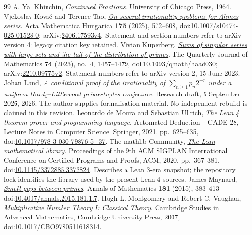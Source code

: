\begin{thebibliography}{99}
 A. Ya. Khinchin, \emph{Continued Fractions}.
  University of Chicago Press, 1964.
 Vjekoslav Kova\v{c} and Terence Tao, \href{https://arxiv.org/abs/2406.17593v4}{\emph{On several irrationality problems for Ahmes series}}.
  Acta Mathematica Hungarica \textbf{175} (2025), 572--608, doi:\href{https://doi.org/10.1007/s10474-025-01528-0}{10.1007/s10474-025-01528-0}; arXiv:\href{https://arxiv.org/abs/2406.17593v4}{2406.17593v4}. Statement and section numbers refer to arXiv version 4; legacy citation key retained.
 Vivian Kuperberg, \href{https://arxiv.org/abs/2210.09775v2}{\emph{Sums of singular series with large sets and the tail of the distribution of primes}}.
  The Quarterly Journal of Mathematics \textbf{74} (2023), no.~4, 1457--1479, doi:\href{https://doi.org/10.1093/qmath/haad030}{10.1093/qmath/haad030}; arXiv:\href{https://arxiv.org/abs/2210.09775v2}{2210.09775v2}. Statement numbers refer to arXiv version 2, 15 June 2023.
 Johan Land, \href{https://github.com/beetree/math_erdos_251}{\emph{A conditional proof of the irrationality of $\sum_{n\ge1}p_n2^{-n}$ under a uniform Hardy--Littlewood prime-tuples conjecture}}.
  Research draft, 5 September 2026, 2026. The author supplies formalisation material. No independent rebuild is claimed in this revision.
 Leonardo de Moura and Sebastian Ullrich, \href{https://doi.org/10.1007/978-3-030-79876-5_37}{\emph{The Lean 4 theorem prover and programming language}}.
  Automated Deduction -- CADE 28, Lecture Notes in Computer Science, Springer, 2021, pp.~625--635, doi:\href{https://doi.org/10.1007/978-3-030-79876-5_37}{10.1007/978-3-030-79876-5\_37}.
 {The mathlib Community}, \href{https://doi.org/10.1145/3372885.3373824}{\emph{The Lean mathematical library}}.
  Proceedings of the 9th ACM SIGPLAN International Conference on Certified Programs and Proofs, ACM, 2020, pp.~367--381, doi:\href{https://doi.org/10.1145/3372885.3373824}{10.1145/3372885.3373824}. Describes a Lean 3-era snapshot; the repository lock identifies the library used by the present Lean 4 sources.
 James Maynard, \href{https://doi.org/10.4007/annals.2015.181.1.7}{\emph{Small gaps between primes}}.
  Annals of Mathematics \textbf{181} (2015), 383--413, doi:\href{https://doi.org/10.4007/annals.2015.181.1.7}{10.4007/annals.2015.181.1.7}.
 Hugh L. Montgomery and Robert C. Vaughan, \href{https://doi.org/10.1017/CBO9780511618314}{\emph{Multiplicative Number Theory I: Classical Theory}}.
  Cambridge Studies in Advanced Mathematics, Cambridge University Press, 2007, doi:\href{https://doi.org/10.1017/CBO9780511618314}{10.1017/CBO9780511618314}.

\end{thebibliography}
